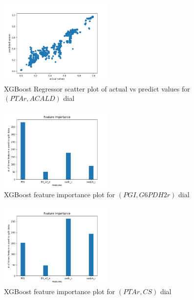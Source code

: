 \documentclass[12pt,chapterheads]{ucsd}
\begin{document}
\begin{figure}[h] 
\centering
\includegraphics[width=0.5\textwidth]{PTAr_ACALD_xgboost_no_params}
\caption[XGBoost Regressor scatter plot of actual vs predict values for $(PTAr, ACALD)$ dial]
{XGBoost Regressor scatter plot of actual vs predict values for $(PTAr, ACALD)$ dial}
\label{fig:PtarAcaldXgb}
\end{figure}

\begin{figure}[h] 
\centering
\includegraphics[width=0.5\textwidth]{PGI_G6PDH2r_xgboost_no_params_important_features}
\caption[XGBoost feature importance plot for $(PGI, G6PDH2r)$ dial]
{XGBoost feature importance plot for $(PGI, G6PDH2r)$ dial}
\label{fig:PgiG6pdh2rXgbImp}
\end{figure}

\begin{figure}[h] 
\centering
\includegraphics[width=0.5\textwidth]{PTAr_CS_xgboost_no_params_important_features}
\caption[XGBoost feature importance plot for $(PTAr, CS)$ dial]
{XGBoost feature importance plot for $(PTAr, CS)$ dial}
\label{fig:PtarCsXgbImp}
\end{figure}
\end{document}
